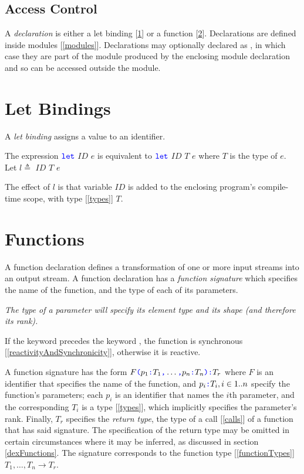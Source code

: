 \documentclass{article}
\begin{document}
\subsection{Access Control}
\label{accessControl}

A {\em declaration} is either a let binding [\ref{letBindings}] or a function [\ref{functions}]. Declarations are defined inside modules [\ref{modules}]. Declarations may optionally declared as \PUBLIC{}, in which case they are part of the module produced by the enclosing module declaration and so can be accessed outside the module.


\section{Let Bindings}
\label{letBindings}

A {\em let binding} assigns a value to an identifier. 

\LetBinding{}

The expression $\texttt{\color{blue} let}{}$ $ID$ \BIND{} $e$ is equivalent to $\texttt{\color{blue} let}{}$ $ID$\COLON{} $T$ \BIND{} $e$  where $T$ is the type of $e$.
Let  $l \triangleq $ \LET{} $ID$\COLON{} $T$ \BIND{} $e$

The effect of $l$ is that variable $ID$ is added to the enclosing program's compile-time scope, with type [\ref{types}] $T$.


\section{Functions}
\label{functions}

\FunctionDeclaration

A function declaration defines a transformation of one or more input streams into an output stream. A function declaration has a
{\em function signature} which specifies the name of the function, and the type of each of its parameters.

{\em The type of a parameter will specify its element type and its shape (and therefore its rank). }

If the keyword \SYNC precedes the keyword \FUNC, the function is synchronous [\ref{reactivityAndSynchronicity}], otherwise it is reactive.

\FunctionSignature{}

\FunctionSignatureOptionalReturn{}

\ParameterList{}

\Parameter{}

A function signature has the form  $F\texttt{\color{blue} (}{}p_1\texttt{\color{blue} :} T_1\texttt{\color{blue} ,}{} \ldots\texttt{\color{blue} ,}{} p_n\texttt{\color{blue} :} T_n\texttt{\color{blue} )}{}\texttt{\color{blue} :} T_r$ where $F$ is an identifier that specifies the name of the function, and $p_i\texttt{\color{blue} :}{} T_i, i \in 1..n$ specify the function's parameters; each $p_i$ is an identifier that names the $i$th parameter, and the corresponding $T_i$ is a type [\ref{types}], which implicitly specifies the parameter's rank.  Finally, $T_r$ specifies the {\em return type}, the type of a call [\ref{calls}] of a function that has said signature. The specification of the return type may be omitted in certain circumstances where it may be inferred, as discussed in section \ref{dexFunctions}.
The signature corresponds to the function type [\ref{functionTypes}] $T_1, \ldots, T_n \to T_r$.
\end{document}
